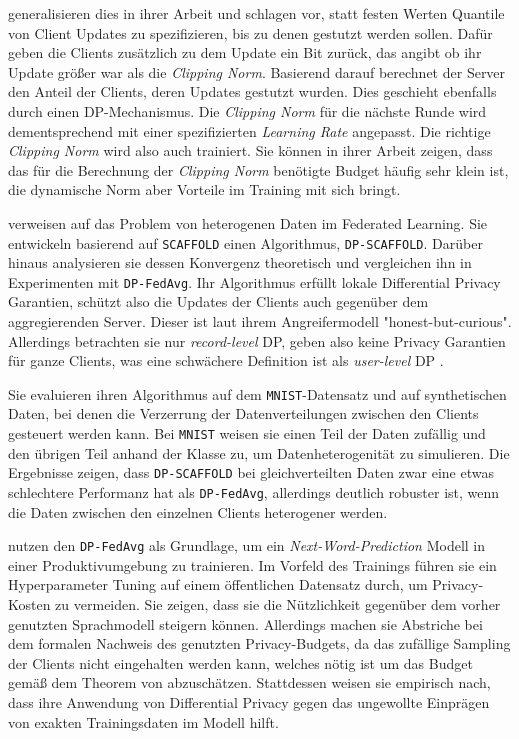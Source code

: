 \textcite{andrew:2021} generalisieren dies in ihrer Arbeit und schlagen vor, statt festen Werten Quantile von Client Updates zu spezifizieren, bis zu denen gestutzt werden sollen. Dafür geben die Clients zusätzlich zu dem Update ein Bit zurück, das angibt ob ihr Update größer war als die \textit{Clipping Norm}. Basierend darauf berechnet der Server den Anteil der Clients, deren Updates gestutzt wurden. Dies geschieht ebenfalls durch einen DP-Mechanismus. Die \textit{Clipping Norm} für die nächste Runde wird dementsprechend mit einer spezifizierten \textit{Learning Rate} angepasst. Die richtige \textit{Clipping Norm} wird also auch trainiert. Sie können in ihrer Arbeit zeigen, dass das für die Berechnung der \textit{Clipping Norm} benötigte Budget häufig sehr klein ist, die dynamische Norm aber Vorteile im Training mit sich bringt.

\textcite{noble:2023} verweisen auf das Problem von heterogenen Daten im Federated Learning. Sie entwickeln basierend auf \texttt{SCAFFOLD} einen Algorithmus, \texttt{DP-SCAFFOLD}. Darüber hinaus analysieren sie dessen Konvergenz theoretisch und vergleichen ihn in Experimenten mit \texttt{DP-FedAvg}. Ihr Algorithmus erfüllt lokale Differential Privacy Garantien, schützt also die Updates der Clients auch gegenüber dem aggregierenden Server. Dieser ist laut ihrem Angreifermodell "honest-but-curious". Allerdings betrachten sie nur \textit{record-level} DP, geben also keine Privacy Garantien für ganze Clients, was eine schwächere Definition ist als \textit{user-level} DP \cite[p.44]{kairouz:2021}.

Sie evaluieren ihren Algorithmus auf dem \texttt{MNIST}-Datensatz und auf synthetischen Daten, bei denen die Verzerrung der Datenverteilungen zwischen den Clients gesteuert werden kann. Bei \texttt{MNIST} weisen sie einen Teil der Daten zufällig und den übrigen Teil anhand der Klasse zu, um Datenheterogenität zu simulieren. Die Ergebnisse zeigen, dass \texttt{DP-SCAFFOLD} bei gleichverteilten Daten zwar eine etwas schlechtere Performanz hat als \texttt{DP-FedAvg}, allerdings deutlich robuster ist, wenn die Daten zwischen den einzelnen Clients heterogener werden.

\textcite{ramaswamy:2020} nutzen den \texttt{DP-FedAvg} als Grundlage, um ein \textit{Next-Word-Prediction} Modell in einer Produktivumgebung zu trainieren. Im Vorfeld des Trainings führen sie ein Hyperparameter Tuning auf einem öffentlichen Datensatz durch, um Privacy-Kosten zu vermeiden. Sie zeigen, dass sie die Nützlichkeit gegenüber dem vorher genutzten Sprachmodell steigern können. Allerdings machen sie Abstriche bei dem formalen Nachweis des genutzten Privacy-Budgets, da das zufällige Sampling der Clients nicht eingehalten werden kann, welches nötig ist um das Budget gemäß dem Theorem von \textcite{wang:2020} abzuschätzen. Stattdessen weisen sie empirisch nach, dass ihre Anwendung von Differential Privacy gegen das ungewollte Einprägen von exakten Trainingsdaten im Modell hilft.


